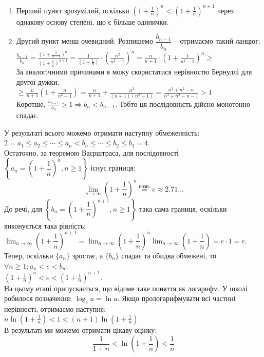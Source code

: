 \documentclass[a4paper, 14pt]{article}
\theoremstyle{theoremdd}
\theoremstyle{theoremdd}
\theoremstyle{theoremdd}
\theoremstyle{theoremdd}
\theoremstyle{theoremdd}
\theoremstyle{theoremdd}
\theoremstyle{theoremdd}
\theoremstyle{theoremdd}
\begin{document}
	\begin{enumerate}[wide=0pt, label={\alph*)}]
	\item Перший пункт зрозумілий, оскільки $\displaystyle \left(1+\frac{1}{n} \right)^n < \left(1+\frac{1}{n} \right)^{n+1}$ через однакову основу степені, що є більше одинички.
	\item Другий пункт менш очевидний. Розпишемо $\dfrac{b_{n-1}}{b_n}$ -- отримаємо такий ланцюг:\\
	$\displaystyle \frac{b_{n-1}}{b_n} = \frac{\displaystyle \left(1+\frac{1}{n-1} \right)^{n}}{\displaystyle \left(1+\frac{1}{n} \right)^{n+1}} = \frac{1}{\displaystyle \left(1+\frac{1}{n}\right)} \cdot \left(\frac{n^2}{n^2-1}\right)^n = \frac{n}{n+1} \cdot \left(1+\frac{1}{n^2-1} \right)^n \boxed{\geq}$\\
	За аналогічними причинами я можу скористатися нерівностю Бернуллі для другої дужки.\\
	$\displaystyle \boxed{\geq} \frac{n}{n+1} \left(1+\frac{n}{n^2-1}\right) = \frac{n}{n+1} + \frac{n^2}{(n+1)(n^2-1)} = \frac{n^3+n^2-n}{n^3+n^2-n-1} > 1$\\
	Коротше, $\displaystyle \frac{b_{n-1}}{b_n} > 1 \Rightarrow b_n < b_{n-1}$. Тобто ця послідовність дійсно монотонно спадає.
	\end{enumerate}
	
	У результаті всього можемо отримати наступну обмеженність:\\
	$2=a_1 \leq a_2 \leq \cdots \leq a_n < b_n \leq \cdots \leq b_2 \leq b_1 = 4$.
	\bigskip \\
	Остаточно, за теоремою Ваєрштраса, для послідовності $\left\{a_n = \left(1 + \dfrac{1}{n} \right)^n, n \geq 1 \right\}$ існує границя:
	$$\displaystyle \lim_{n \to \infty}\left(1+\frac{1}{n} \right)^n \overset{\text{позн.}}{=} e \approx 2.71...$$
	До речі, для $\left\{b_n = \left( 1 + \dfrac{1}{n} \right)^{n+1}, n \geq 1 \right\}$ така сама границя, оскільки виконується така рівність: \\ $\displaystyle\lim_{n \to \infty} \left( 1 + \dfrac{1}{n} \right)^{n+1} = \lim_{n \to \infty} \left( 1 + \dfrac{1}{n} \right)^n \lim_{n \to \infty} \left(1 + \dfrac{1}{n} \right) = e \cdot 1 = e$.
	\bigskip \\	
	Тепер, оскільки $\{a_n \}$ зростає, а $\{b_n \}$ спадає та обидва обмежені, то $\forall n \geq 1: a_n<e<b_n$.\\
	$\displaystyle \left(1+\frac{1}{n} \right)^n < e < \left(1+\frac{1}{n} \right)^{n+1}$.\\
	На цьому етапі припускається, що відоме таке поняття як логарифм. У школі робилося позначення: $\log_{e} a =\ln a$. Якщо прологарифмувати всі частині нерівності, отримаємо наступне:\\
	$\displaystyle n \ln \left(1+\frac{1}{n} \right) < 1 < (n+1) \ln \left(1+\frac{1}{n} \right)$\\
	В результаті ми можемо отримати цікаву оцінку:
	$$\frac{1}{1+n} < \ln (1+\frac{1}{n}) < \frac{1}{n}$$
	
\end{document}
